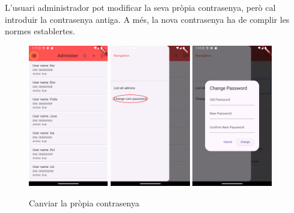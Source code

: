 \documentclass[a4paper,12pt,twoside]{ThesisStyle}
\begin{document}
L'usuari administrador pot modificar la seva pròpia contrasenya, però cal introduir la contrasenya antiga. A més, la nova contrasenya ha de complir les normes establertes.

\begin{figure}[h]
    \centering
    \includegraphics[width=0.31\textwidth]{imatges/adminMain.png}
    \includegraphics[width=0.31\textwidth]{imatges/adminNavigation2.png}
    \includegraphics[width=0.31\textwidth]{imatges/adminchangepassword.png}
    \caption{Canviar la pròpia contrasenya}
    \label{fig:Canviar la pròpia contrasenya }
\end{figure}
\end{document}
